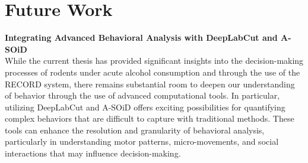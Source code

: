 \documentclass{article}
\begin{document}
\clearpage

\section{Future Work}
\noindent\textbf{Integrating Advanced Behavioral Analysis with DeepLabCut and A-SOiD}\\
While the current thesis has provided significant insights into the decision-making processes of rodents under acute alcohol consumption and through the use of the RECORD system, there remains substantial room to deepen our understanding of behavior through the use of advanced computational tools. In particular, utilizing DeepLabCut and A-SOiD offers exciting possibilities for quantifying complex behaviors that are difficult to capture with traditional methods. These tools can enhance the resolution and granularity of behavioral analysis, particularly in understanding motor patterns, micro-movements, and social interactions that may influence decision-making.
\end{document}
